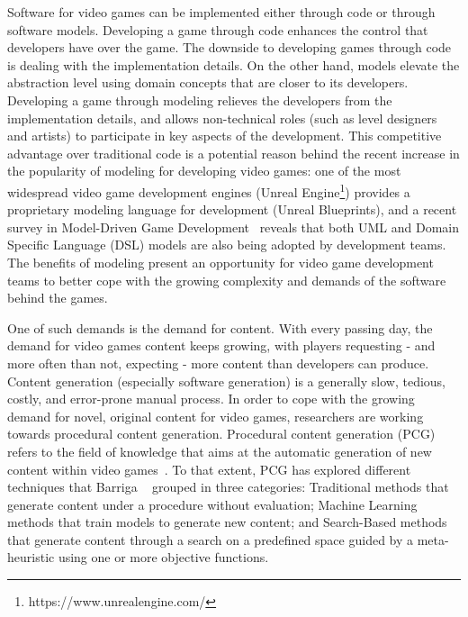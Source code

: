 Software for video games can be implemented either through code or through software models. Developing a game through code enhances the control that developers have over the game. The downside to developing games through code is dealing with the implementation details. On the other hand, models elevate the abstraction level using domain concepts that are closer to its developers. Developing a game through modeling relieves the developers from the implementation details, and allows non-technical roles (such as level designers and artists) to participate in key aspects of the development. This competitive advantage over traditional code is a potential reason behind the recent increase in the popularity of modeling for developing video games: one of the most widespread video game development engines (Unreal Engine\footnote{https://www.unrealengine.com/}) provides a proprietary modeling language for development (Unreal Blueprints), and a recent survey in Model-Driven Game Development~\cite{zhu2019model} reveals that both UML and Domain Specific Language (DSL) models are also being adopted by development teams. The benefits of modeling present an opportunity for video game development teams to better cope with the growing complexity and demands of the software behind the games.


One of such demands is the demand for content. With every passing day, the demand for video games content keeps growing, with players requesting - and more often than not, expecting - more content than developers can produce. Content generation (especially software generation) is a generally slow, tedious, costly, and error-prone manual process. In order to cope with the growing demand for novel, original content for video games, researchers are working towards procedural content generation. Procedural content generation (PCG) refers to the field of knowledge that aims at the automatic generation of new content within video games~\cite{hendrikx2013procedural}. To that extent, PCG has explored different techniques that Barriga \etal~\cite{Barriga2019} grouped in three categories: Traditional methods that generate content under a procedure without evaluation; Machine Learning methods that train models to generate new content; and Search-Based methods that generate content through a search on a predefined space guided by a meta-heuristic using one or more objective functions.

